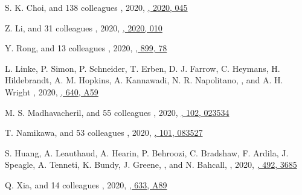 \begin{etaremune}
\item
S. K. Choi, and 138 colleagues
,
2020, \href{https://ui.adsabs.harvard.edu/abs/2020JCAP...12..045C}{\jcap, 2020, 045}

\item
Z. Li, and 31 colleagues
,
2020, \href{https://ui.adsabs.harvard.edu/abs/2020JCAP...09..010L}{\jcap, 2020, 010}

\item
Y. Rong, and 13 colleagues
,
2020, \href{https://ui.adsabs.harvard.edu/abs/2020ApJ...899...78R}{\apj, 899, 78}

\item
L. Linke, P. Simon, P. Schneider, T. Erben, D. J. Farrow, C. Heymans, H. Hildebrandt, A. M. Hopkins, A. Kannawadi, N. R. Napolitano, \myself, and A. H. Wright
,
2020, \href{https://ui.adsabs.harvard.edu/abs/2020A&A...640A..59L}{\aap, 640, A59}

\item
M. S. Madhavacheril, and 55 colleagues
,
2020, \href{https://ui.adsabs.harvard.edu/abs/2020PhRvD.102b3534M}{\prd, 102, 023534}

\item
T. Namikawa, and 53 colleagues
,
2020, \href{https://ui.adsabs.harvard.edu/abs/2020PhRvD.101h3527N}{\prd, 101, 083527}

\item
S. Huang, A. Leauthaud, A. Hearin, P. Behroozi, C. Bradshaw, F. Ardila, J. Speagle, A. Tenneti, K. Bundy, J. Greene, \myself, and N. Bahcall,
,
2020, \href{https://ui.adsabs.harvard.edu/abs/2020MNRAS.492.3685H}{\mnras, 492, 3685}

\item
Q. Xia, and 14 colleagues
,
2020, \href{https://ui.adsabs.harvard.edu/abs/2020A&A...633A..89X}{\aap, 633, A89}


\end{etaremune}
